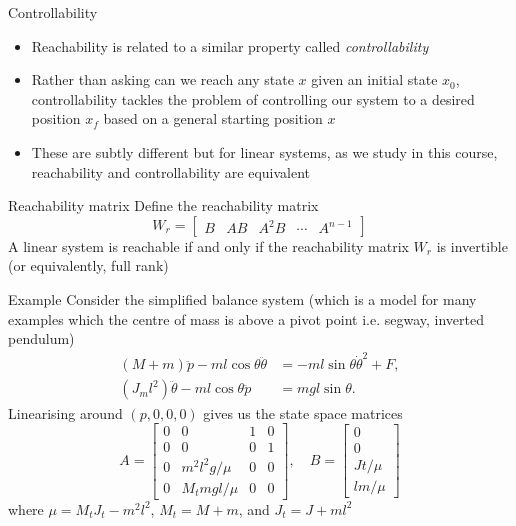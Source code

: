 \documentclass{beamer-control}
\begin{document}
\begin{frame}{Controllability}
	\begin{itemize}
		\item Reachability is related to a similar property called \textit{controllability}
		\item Rather than asking can we reach any state $x$ given an initial state $x_0$, controllability tackles the problem of controlling our system to a desired position $x_f$ based on a general starting position $x$
		\item These are subtly different but for linear systems, as we study in this course, reachability and controllability are equivalent
	\end{itemize}
\end{frame}



\begin{frame}{Reachability matrix}
	Define the reachability matrix
	\[W_r = \begin{bmatrix}
		B & AB & A^2 B & \cdots & A^{n-1}
	\end{bmatrix}\]
A linear system is reachable if and only if the reachability matrix $W_r$ is invertible (or equivalently, full rank)

\end{frame}

\begin{frame}{Example}
	Consider the simplified balance system (which is a model for many examples which the centre of mass is above a pivot point i.e. segway, inverted pendulum)
	\begin{align*}
		(M+m)\ddot{p}-ml\cos \theta \ddot{\theta} &= -ml\sin\theta \dot{\theta}^2+F,\\
		(J_ml^2)\ddot{\theta} -ml\cos \theta \ddot{p} &= mgl\sin \theta.
	\end{align*}
	Linearising around $(p,0,0,0)$ gives us the state space matrices
	\[ A=\begin{bmatrix}
		0 & 0 & 1 & 0\\
		0 & 0 & 0 & 1\\
		0 & m^2l^2g/\mu & 0 & 0 \\ 0& M_tmgl/\mu & 0 & 0
	\end{bmatrix}, \quad
	B = \begin{bmatrix}
		0 \\ 0 \\ Jt/\mu \\ lm/\mu
	\end{bmatrix}\]
	where $\mu=M_tJ_t-m^2l^2$, $M_t=M+m$, and $J_t=J+ml^2$
\end{frame}
\end{document}
